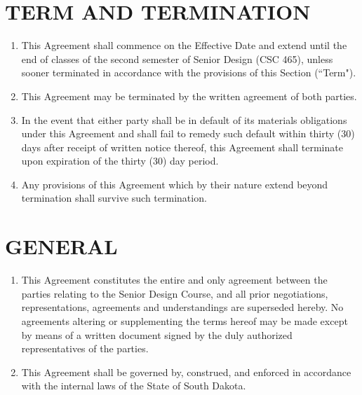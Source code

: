 \documentclass[11pt]{article}
\begin{document}
\section{TERM AND TERMINATION }    
\begin{enumerate}  \itemsep4pt \parskip0pt 
\item This Agreement shall commence on the Effective Date and extend until the end of classes of the second semester of Senior Design (CSC 465), unless sooner terminated in accordance with the provisions of this Section (``Term"). 

\item This Agreement may be terminated by the written agreement of both parties.    

\item In the event that either party shall be in default of its materials obligations under this Agreement and shall fail to remedy such default within thirty (30) days after receipt of written notice thereof, this Agreement shall terminate upon expiration of the thirty (30) day period.    

\item Any provisions of this Agreement which by their nature extend beyond termination shall survive such termination.  
\end{enumerate}


\section{GENERAL }    
\begin{enumerate}  \itemsep4pt \parskip0pt 
\item This Agreement constitutes the entire and only agreement between the parties relating to the Senior Design Course, and all prior negotiations, representations, agreements and understandings are superseded hereby. No agreements altering or supplementing the terms hereof may be made except by means of a written document signed by the duly authorized representatives of the parties.    

\item This Agreement shall be governed by, construed, and enforced in accordance with the internal laws of the State of South Dakota. 
\end{enumerate}
\end{document}
